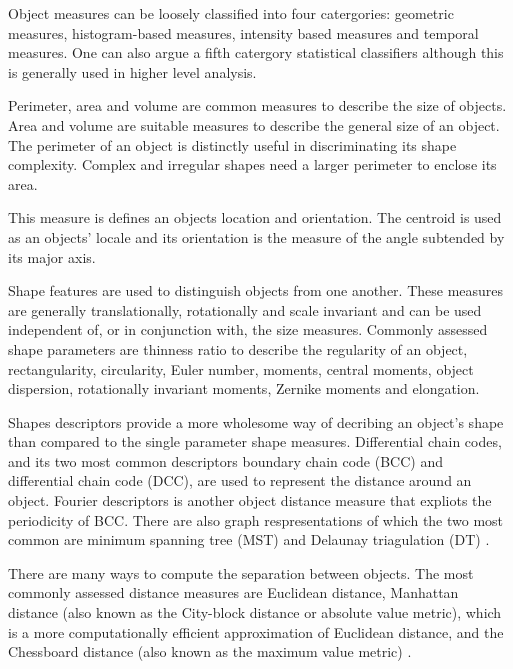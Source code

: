 Object measures can be loosely classified into four catergories: geometric measures, histogram-based measures, intensity based measures and temporal measures. One can also argue a fifth catergory statistical classifiers although this is generally used in higher level analysis.

\begin{definition}
	Perimeter, area and volume are common measures to describe the size of objects.
	Area and volume are suitable measures to describe the general size of an object.
	The perimeter of an object is distinctly useful in discriminating its shape complexity. Complex and irregular shapes need a larger perimeter to enclose its area.
\end{definition}

\begin{definition}
	This measure is defines an objects location and orientation.
	The centroid is used as an objects' locale and its orientation is the measure of the angle subtended by its major axis.
\end{definition}

\begin{definition}
	Shape features are used to distinguish objects from one another.
	These measures are generally translationally, rotationally and scale invariant and can be used independent of, or in conjunction with, the size measures.
	Commonly assessed shape parameters are thinness ratio to describe the regularity of an object, rectangularity, circularity, Euler number, moments, central moments, object dispersion, rotationally invariant moments, Zernike moments and elongation.
\end{definition}

\begin{definition}
	Shapes descriptors provide a more wholesome way of decribing an object's shape than compared to the single parameter shape measures.
	Differential chain codes, and its two most common descriptors boundary chain code (BCC) and differential chain code (DCC), are used to represent the distance around an object.
	Fourier descriptors is another object distance measure that expliots the periodicity of BCC.
	There are also graph respresentations of which the two most common are minimum spanning tree (MST) \citep{Giesen2014,Yuan2009} and Delaunay triagulation (DT) \citep{Kozubek2000,Attali1997}.
\end{definition}

\begin{definition}
	There are many ways to compute the separation between objects.
	The most commonly assessed distance measures are Euclidean distance, Manhattan distance (also known as the City-block distance or absolute value metric), which is a more computationally efficient approximation of Euclidean distance, and the Chessboard distance (also known as the maximum value metric) \citep{French2008,Zinchuk2007}.
\end{definition}

